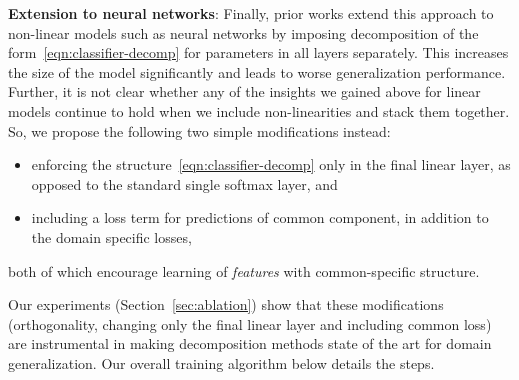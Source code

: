 \documentclass{article}
\begin{document}
%
 

\textbf{Extension to neural networks}:
Finally, prior works extend this approach to non-linear models such as neural networks by imposing decomposition of the form~\eqref{eqn:classifier-decomp} for parameters in all layers separately. This increases the size of the model significantly and leads to worse generalization performance. Further, it is not clear whether any of the insights we gained above for linear models continue to hold when we include non-linearities and stack them together. So, we propose the following two simple modifications instead:
\begin{itemize}
    \item enforcing the structure~\eqref{eqn:classifier-decomp} only in the final linear layer, as opposed to the standard single softmax layer, and
\item including a loss term for predictions of common component, in addition to the domain specific losses,
\end{itemize}
both of which encourage learning of \emph{features} with common-specific structure.

Our experiments (Section~\ref{sec:ablation}) show that these modifications (orthogonality, changing only the final linear layer and including common loss) are instrumental in making decomposition methods state of the art for domain generalization. Our overall training algorithm below details the steps.
\end{document}
